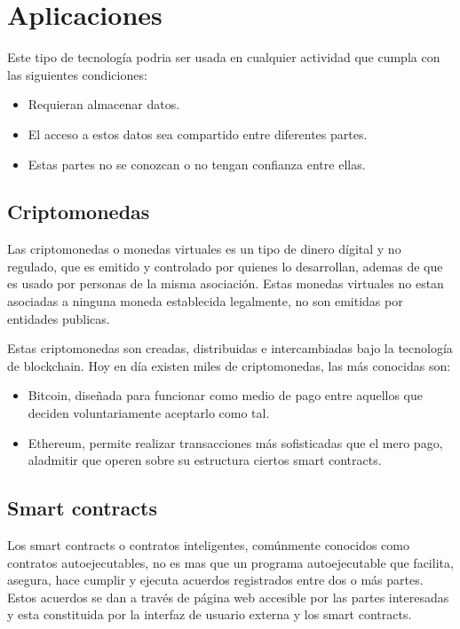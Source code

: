 \documentclass[conference]{IEEEtran}
\begin{document}
\section{Aplicaciones}

Este tipo de tecnología podria ser usada en cualquier actividad que cumpla con las siguientes condiciones:

\begin{itemize}
    \item Requieran almacenar datos.
    \item El acceso a estos datos sea compartido entre diferentes partes.
    \item Estas partes no se conozcan o no tengan confianza entre ellas.
\end{itemize}

\subsection{Criptomonedas}

Las criptomonedas o monedas virtuales es un tipo de dinero dígital y no regulado, que es emitido y controlado por quienes lo desarrollan, ademas de que es usado por personas de la misma asociación. Estas monedas virtuales no estan asociadas a ninguna moneda establecida legalmente, no son emitidas por entidades publicas.

Estas criptomonedas son creadas, distribuidas e intercambiadas bajo la tecnología de blockchain. Hoy en día existen miles de criptomonedas, las más conocidas son:

\begin{itemize}
    \item Bitcoin,  diseñada para funcionar como medio de pago entre aquellos que deciden voluntariamente aceptarlo como tal.
    \item Ethereum, permite realizar transacciones más sofisticadas que el mero pago, aladmitir que operen sobre su estructura ciertos smart contracts.
\end{itemize}

\subsection{Smart contracts}

Los smart contracts o contratos inteligentes, comúnmente
conocidos como contratos autoejecutables, no es mas que un programa
autoejecutable que facilita, asegura, hace cumplir y ejecuta acuerdos registrados entre dos o más partes. Estos acuerdos se dan a través de página web accesible por las partes interesadas y esta constituida por la interfaz de usuario externa y los smart contracts.
\end{document}
